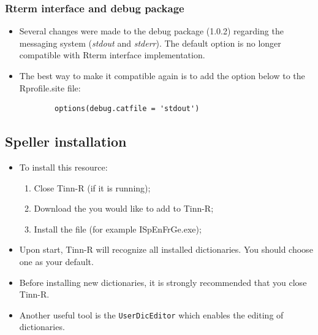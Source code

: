 \newpage
\subsubsection{Rterm interface and debug package}

\begin{itemize}
  \item Several changes were made to the debug package (1.0.2) regarding
    the messaging system (\textit{stdout} and \textit{stderr}). The
    default option is no longer compatible with Rterm interface
    implementation.
  \item The best way to make it compatible again is to add the option
    below to the Rprofile.site file:

    \begin{footnotesize}
      \begin{verbatim}
        options(debug.catfile = 'stdout')
      \end{verbatim}
    \end{footnotesize}
\end{itemize}


\hypertarget{configuration_spellerinstalation}{}
\subsection{Speller installation}

\begin{itemize}
  \item To install this resource:
    \begin{enumerate}
      \item Close Tinn-R (if it is running);
      \item Download the
        you would like to add to Tinn-R;
      \item Install the file (for example ISpEnFrGe.exe);
    \end{enumerate}
  \item Upon start, Tinn-R will recognize all installed dictionaries.
    You should choose one as your default.
  \item Before installing new dictionaries, it is strongly
    recommended that you close Tinn-R.
  \item Another useful tool is the \texttt{UserDicEditor} which
    enables the editing of dictionaries.
\end{itemize}


